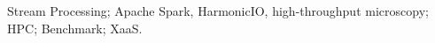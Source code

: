 \documentclass[letterpaper,conference]{IEEEtran}
\begin{document}
\begin{abstract}







\end{abstract}



\begin{IEEEkeywords}Stream Processing; Apache Spark, HarmonicIO, high-throughput microscopy; HPC; Benchmark; XaaS.\end{IEEEkeywords} %
\end{document}
